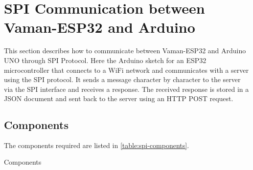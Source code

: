 \section{SPI Communication between Vaman-ESP32 and Arduino}
This section describes how to communicate between Vaman-ESP32 and Arduino UNO
through SPI Protocol. Here the Arduino sketch for an ESP32 microcontroller that
connects to a WiFi network and communicates with a server using the SPI
protocol. It sends a message character by character to the server via the SPI
interface and receives a response. The received response is stored in a JSON
document and sent back to the server using an HTTP POST request.

\subsection{Components}
The components required are listed in \autoref{table:spi-components}.
\begin{table}[!ht]
\centering

\caption{Components}
\label{table:spi-components}
\end{table}

